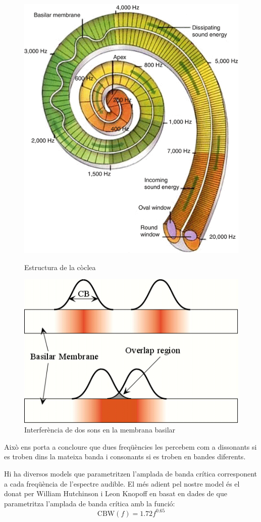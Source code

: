 \documentclass{article}
\theoremstyle{definition}
\newcommand{\0}{\ensuremath{\vb{0}}}
\begin{document}
\begin{figure}
    \begin{minipage}[c]{0.49\linewidth}
        \centering
        \includegraphics[height=0.6\linewidth]{Imatges_beamer2/coclea.png}
        \caption{Estructura de la còclea}
        \label{coclea}
    \end{minipage}
    \hfill
    \begin{minipage}[c]{0.49\linewidth}
        \centering
        \includegraphics[height=0.6\linewidth]{Imatges_beamer2/basilar_membrane.jpg}
        \caption{Interferència de dos sons en la mem\-bra\-na basilar}
        \label{membrana}
    \end{minipage}
\end{figure}
Això ens porta a concloure que dues freqüències les percebem com a dissonants si es troben dins la mateixa banda i consonants si es troben en bandes diferents. \par
Hi ha diversos models que parametritzen l'amplada de banda crítica corresponent a cada freqüència de l'espectre audible. El més adient pel nostre model és el donat per William Hutchinson i Leon Knopoff en \cite{hutchinson} basat en dades de \cite{plomp,goodwin,mayer} que parametritza l'amplada de banda crítica amb la funció:
\begin{equation}
    \text{CBW}(f)=1.72 f^{0.65}
    \label{CBW}
\end{equation}
\end{document}

